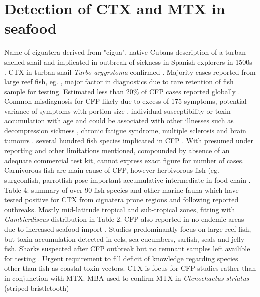 \section{Detection of CTX and MTX in seafood}
Name of ciguatera derived from "cigua", native Cubans description of a turban shelled snail and implicated in outbreak of sickness in Spanish explorers in 1500s \cite{gudger1930poisonous}. CTX in turban snail \emph{Turbo argyrstoma} confirmed \cite{yasumoto1976toxicity}.
Majority cases reported from large reef fish, eg. \cite{hokama2001ciguatera,lewis2001changing,dechraoui2005use,laurent2005ciguatera}, major factor in diagnostics due to rare retention of fish sample for testing.
Estimated less than 20\% of CFP cases reported globally \cite{dickey2010ciguatera}. Common misdiagnosis for CFP likely due to excess of 175 symptoms\cite{sims1987theoretical}, potential variance of symptoms with portion size \cite{wong2008features}, individual susceptibility or toxin accumulation with age \cite{bagnis1979clinical,glaziou1993study} and could be associated with other illnesses such as decompression sickness \cite{adams1993outbreak}, chronic fatigue syndrome, multiple sclerosis \cite{lindsay1997chronic,ting2001ciguatera} and brain tumours \cite{lindsay1997chronic}.
several hundred fish species implicated in CFP \cite{}. %
With presumed under reporting and other limitations mentioned, compounded by absence of an adequate commercial test kit, cannot express exact figure for number of cases. Carnivorous fish are main cause of CFP, however herbivorous fish (eg. surgeonfish, parrotfish pose important accumulative intermediate in food chain \cite{cruz2006macroalgal,randall1958review}.
Table 4: summary of over 90 fish species and other marine fauna which have tested positive for CTX from ciguatera prone regions and following reported outbreaks. Mostly mid-latitude tropical and sub-tropical zones, fitting with \emph{Gambierdiscus} distribution in Table 2.
CFP also reported in no-endemic areas due to increased seafood import \cite{glaziou1994epidemiology,ting2001ciguatera}. Studies predominantly focus on large reef fish, but toxin accumulation detected in eels, sea cucumbers, sarfish, seals and jelly fish. %
Sharks suspected after CFP outbreak but no remnant samples left availible for testing \cite{boisier1995fatal,lehane2000ciguatera}. Urgent requirement to fill deficit of knowledge regarding species other than fish as coastal toxin vectors.
CTX is focus for CFP studies rather than in conjunction with MTX.
MBA used to confirm MTX in \emph{Ctenochaetus striatus} (striped bristletooth) \cite{bagnis1987use} %

